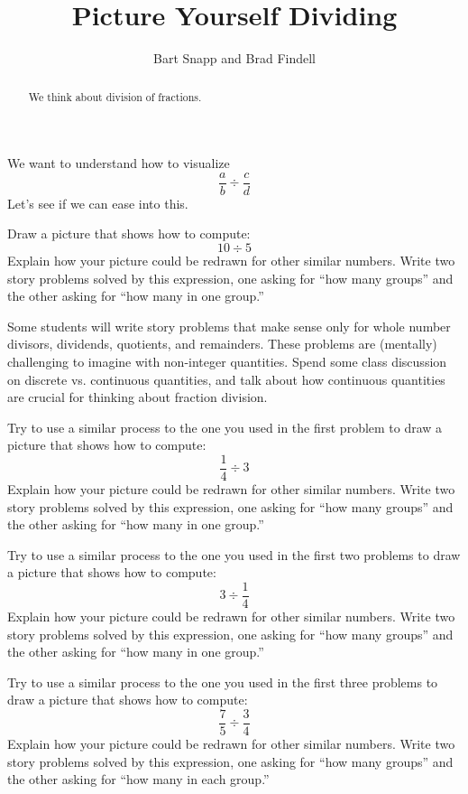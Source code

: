 \documentclass[nooutcomes]{ximera}
\title{Picture Yourself Dividing}
\author{Bart Snapp and Brad Findell}
\begin{document}
\begin{abstract}
We think about division of fractions.
\end{abstract}
\maketitle


We want to understand how to visualize 
\[
\frac{a}{b} \div \frac{c}{d}
\]
Let's see if we can ease into this.

\begin{problem}
Draw a picture that shows how to compute:
\[
10\div 5
\]
Explain how your picture could be redrawn for other similar
numbers. Write two story problems solved by this expression, one
asking for ``how many groups'' and the other asking for ``how many in
one group.''
\end{problem}

\begin{teachingnote}
Some students will write story problems that make sense only for whole number divisors, dividends, quotients, and remainders.  These problems are (mentally) challenging to imagine with non-integer quantities.  Spend some class discussion on discrete vs. continuous quantities, and talk about how continuous quantities are crucial for thinking about fraction division.  
\end{teachingnote}

\begin{problem}
Try to use a similar process to the one you used in the first problem
to draw a picture that shows how to compute:
\[
\frac{1}{4} \div 3
\]
Explain how your picture could be redrawn for other similar numbers.
Write two story problems solved by this expression, one asking for
``how many groups'' and the other asking for ``how many in one
group.''
\end{problem}


\begin{problem}
Try to use a similar process to the one you used in the first two problems
to draw a picture that shows how to compute:
\[
3 \div \frac{1}{4}
\]
Explain how your picture could be redrawn for other similar numbers.
Write two story problems solved by this expression, one asking for
``how many groups'' and the other asking for ``how many in one
group.''
\end{problem}



\begin{problem}
Try to use a similar process to the one you used in the first three problems
to draw a picture that shows how to compute:
\[
\frac{7}{5} \div \frac{3}{4}
\]
Explain how your picture could be redrawn for other similar numbers.
Write two story problems solved by this expression, one asking for
``how many groups'' and the other asking for ``how many in each
group.''
\end{problem}
\end{document}

